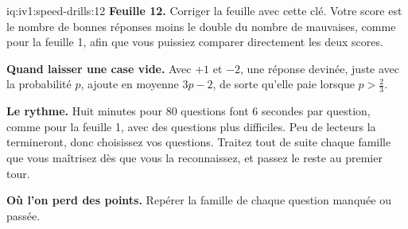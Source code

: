 \begin{solution}{iq:iv1:speed-drills:12}
\textbf{Feuille 12.} Corriger la feuille avec cette clé. Votre score est le nombre de bonnes réponses moins le double du nombre de mauvaises, comme pour la feuille 1, afin que vous puissiez comparer directement les deux scores.
\par\nopagebreak


\textbf{Quand laisser une case vide.} Avec $+1$ et $-2$, une réponse devinée, juste avec la probabilité $p$, ajoute en moyenne $3p - 2$, de sorte qu'elle paie lorsque $p > \tfrac23$.

\textbf{Le rythme.} Huit minutes pour 80 questions font 6 secondes par question, comme pour la feuille 1, avec des questions plus difficiles. Peu de lecteurs la termineront, donc choisissez vos questions. Traitez tout de suite chaque famille que vous maîtrisez dès que vous la reconnaissez, et passez le reste au premier tour.

\textbf{Où l'on perd des points.} Repérer la famille de chaque question manquée ou passée.


\end{solution}
